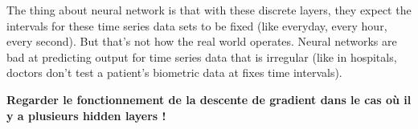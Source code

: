 \documentclass[10pt,a4paper]{article}
\theoremstyle{definition}
\theoremstyle{theorem}
\begin{document}
The thing about neural network is that with these discrete layers, they expect the intervals for these time series data sets to be fixed (like everyday, every hour, every second). But that's not how the real world operates. Neural networks are bad at predicting output for time series data that is irregular (like in hospitals, doctors don't test a patient's biometric data at fixes time intervals). 

\textbf{Regarder le fonctionnement de la descente de gradient dans le cas où il y a plusieurs hidden layers !}
\end{document}
